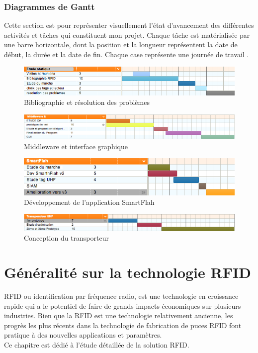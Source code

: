 \documentclass[11pt, a4paper, twoside]{book}
\begin{document}
\subsection{Diagrammes	de Gantt}
Cette section est pour représenter visuellement l'état d'avancement des différentes activités et tâches qui constituent mon projet. Chaque tâche est matérialisée par une barre horizontale, dont la position et la longueur représentent la date de début, la durée et la date de fin. Chaque case représente une journée de travail . 
\begin{figure}[H]
\centering
\includegraphics[width=\textwidth]{etudestatic}
\caption{Bibliographie et résolution des problèmes}

\end{figure}
\begin{figure}[H]
\centering
\includegraphics[width=\textwidth]{mid}
\caption{Middleware et interface graphique}

\end{figure}
\begin{figure}[H]
\centering
\includegraphics[width=\textwidth]{smart}
\caption{Développement de l'application SmartFlah}

\end{figure}
\begin{figure}[H]
\centering
\includegraphics[width=\textwidth]{trans}
\caption{Conception du transporteur}

\end{figure}




\chapter{Généralité sur la technologie RFID}
RFID ou identification par fréquence radio, est une technologie en croissance rapide qui a le potentiel de faire de grands impacts économiques sur plusieurs industries. Bien que la RFID est une technologie relativement ancienne, les progrès les plus récents dans la technologie de fabrication de puces RFID font pratique à des nouvelles applications et paramètres.\\
Ce chapitre est dédié à l'étude	 détaillée de la solution RFID.
\end{document}
